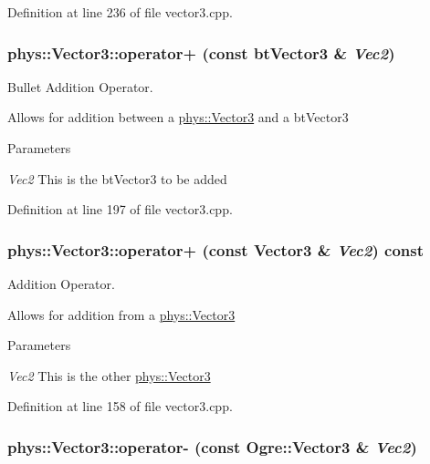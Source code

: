 Definition at line 236 of file vector3.cpp.

\hypertarget{classphys_1_1Vector3_a70c99d125274635b07b0fe90bcc15a8c}{
\subsubsection[{operator+}]{ phys::Vector3::operator+ (const btVector3 \& {\em Vec2})}}
\label{d5/d6a/classphys_1_1Vector3_a70c99d125274635b07b0fe90bcc15a8c}


Bullet Addition Operator. 

Allows for addition between a \hyperlink{classphys_1_1Vector3}{phys::Vector3} and a btVector3 
\begin{DoxyParams}{Parameters}
\item[{\em Vec2}]This is the btVector3 to be added \end{DoxyParams}


Definition at line 197 of file vector3.cpp.

\hypertarget{classphys_1_1Vector3_ab9799d4796f3750d44f591986d78e436}{
\subsubsection[{operator+}]{ phys::Vector3::operator+ (const {\bf Vector3} \& {\em Vec2}) const}}
\label{d5/d6a/classphys_1_1Vector3_ab9799d4796f3750d44f591986d78e436}


Addition Operator. 

Allows for addition from a \hyperlink{classphys_1_1Vector3}{phys::Vector3} 
\begin{DoxyParams}{Parameters}
\item[{\em Vec2}]This is the other \hyperlink{classphys_1_1Vector3}{phys::Vector3} \end{DoxyParams}


Definition at line 158 of file vector3.cpp.

\hypertarget{classphys_1_1Vector3_a54d5fc20ae502ac1443ddbb6cf1fbf1f}{
\subsubsection[{operator-\/}]{ phys::Vector3::operator-\/ (const Ogre::Vector3 \& {\em Vec2})}}
\label{d5/d6a/classphys_1_1Vector3_a54d5fc20ae502ac1443ddbb6cf1fbf1f}



